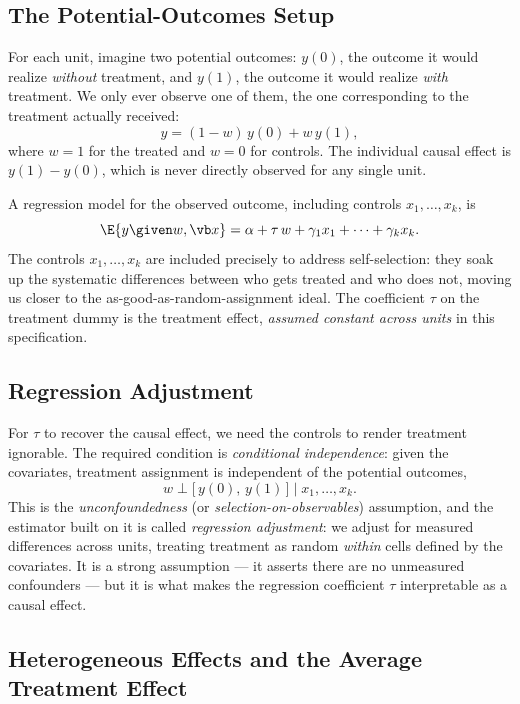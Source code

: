 \subsection{The Potential-Outcomes Setup}

For each unit, imagine two potential outcomes: $y(0)$, the outcome it would realize \emph{without} treatment, and $y(1)$, the outcome it would realize \emph{with} treatment. We only ever observe one of them, the one corresponding to the treatment actually received:
\[
y = (1-w)\,y(0) + w\,y(1),
\]
where $w=1$ for the treated and $w=0$ for controls. The individual causal effect is $y(1)-y(0)$, which is never directly observed for any single unit.

A regression model for the observed outcome, including controls $x_1,\dots,x_k$, is
\[
\E{y \given w, \vb x} = \alpha + \tau\, w + \gamma_1 x_1 + \cdots + \gamma_k x_k.
\]
The controls $x_1,\dots,x_k$ are included precisely to address self-selection: they soak up the systematic differences between who gets treated and who does not, moving us closer to the as-good-as-random-assignment ideal. The coefficient $\tau$ on the treatment dummy is the treatment effect, \emph{assumed constant across units} in this specification.

\subsection{Regression Adjustment}

For $\tau$ to recover the causal effect, we need the controls to render treatment ignorable. The required condition is \emph{conditional independence}: given the covariates, treatment assignment is independent of the potential outcomes,
\[
w \perp \big[\,y(0),\, y(1)\,\big] \;\Big|\; x_1,\dots,x_k.
\]
This is the \emph{unconfoundedness} (or \emph{selection-on-observables}) assumption, and the estimator built on it is called \emph{regression adjustment}: we adjust for measured differences across units, treating treatment as random \emph{within} cells defined by the covariates. It is a strong assumption --- it asserts there are no unmeasured confounders --- but it is what makes the regression coefficient $\tau$ interpretable as a causal effect.

\subsection{Heterogeneous Effects and the Average Treatment Effect}

